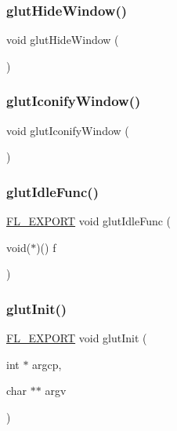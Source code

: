 \subsubsection{\texorpdfstring{glut\+Hide\+Window()}{glutHideWindow()}}
{\footnotesize\ttfamily void glut\+Hide\+Window (\begin{DoxyParamCaption}{ }\end{DoxyParamCaption})\hspace{0.3cm}{\ttfamily [inline]}}

\mbox{\label{glut_8_h_a6608828cd9e8750e6451dfbae5e425db}} 
\subsubsection{\texorpdfstring{glut\+Iconify\+Window()}{glutIconifyWindow()}}
{\footnotesize\ttfamily void glut\+Iconify\+Window (\begin{DoxyParamCaption}{ }\end{DoxyParamCaption})\hspace{0.3cm}{\ttfamily [inline]}}

\mbox{\label{glut_8_h_a703b89ed94cb6fbbd1fc2896cd498e6d}} 
\subsubsection{\texorpdfstring{glut\+Idle\+Func()}{glutIdleFunc()}}
{\footnotesize\ttfamily \hyperlink{_fl___export_8_h_aa9ba29a18aee9d738370a06eeb4470fc}{F\+L\+\_\+\+E\+X\+P\+O\+RT} void glut\+Idle\+Func (\begin{DoxyParamCaption}\item[{void($\ast$)()}]{f }\end{DoxyParamCaption})}

\mbox{\label{glut_8_h_a1e1c50ec9c7000b5084857b6c01f54dc}} 
\subsubsection{\texorpdfstring{glut\+Init()}{glutInit()}}
{\footnotesize\ttfamily \hyperlink{_fl___export_8_h_aa9ba29a18aee9d738370a06eeb4470fc}{F\+L\+\_\+\+E\+X\+P\+O\+RT} void glut\+Init (\begin{DoxyParamCaption}\item[{int $\ast$}]{argcp,  }\item[{char $\ast$$\ast$}]{argv }\end{DoxyParamCaption})}

